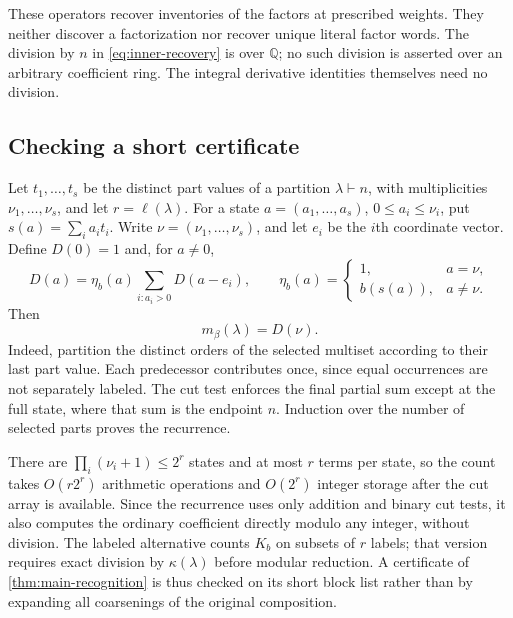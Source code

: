 \documentclass[11pt,a4paper]{amsart}
\numberwithin{equation}{section}
\theoremstyle{plain}
\theoremstyle{definition}
\newcommand{\Q}{\mathbb Q}
\begin{document}
These operators recover inventories of the factors at prescribed weights.
They neither discover a factorization nor recover unique literal factor
words.  The division by \(n\) in \eqref{eq:inner-recovery} is over \(\Q\);
no such division is asserted over an arbitrary coefficient ring.  The
integral derivative identities themselves need no division.

\subsection{Checking a short certificate}
Let \(t_1,\ldots,t_s\) be the distinct part values of a partition
\(\lambda\vdash n\), with multiplicities \(\nu_1,\ldots,\nu_s\),
and let \(r=\ell(\lambda)\).  For a state
\(a=(a_1,\ldots,a_s)\), \(0\le a_i\le\nu_i\), put
\(s(a)=\sum_i a_it_i\).  Write \(\nu=(\nu_1,\ldots,\nu_s)\),
and let \(e_i\) be the \(i\)th coordinate vector.  Define \(D(0)=1\)
and, for \(a\ne0\),
\[
D(a)=\eta_b(a)\sum_{i:a_i>0}D(a-e_i),\qquad
\eta_b(a)=\begin{cases}1,&a=\nu,\\ b(s(a)),&a\ne\nu.\end{cases}
\]
Then
\begin{equation}\label{eq:subset-dp}
m_\beta(\lambda)=D(\nu).
\end{equation}
Indeed, partition the distinct orders of the selected multiset according
to their last part value.  Each predecessor contributes once, since equal
occurrences are not separately labeled.  The cut test enforces the final
partial sum except at the full state, where that sum is the endpoint \(n\).
Induction over the number of selected parts proves the recurrence.

There are \(\prod_i(\nu_i+1)\le2^r\) states and at most \(r\) terms
per state, so the count takes \(O(r2^r)\) arithmetic operations and
\(O(2^r)\) integer storage after the cut array is available.  Since the
recurrence uses only addition and binary cut tests, it also computes the
ordinary coefficient directly modulo any integer, without division.
The labeled alternative counts \(K_b\) on subsets of \(r\) labels;
that version requires exact division by \(\kappa(\lambda)\) before
modular reduction.  A certificate of \cref{thm:main-recognition} is thus
checked on its short block list rather than by expanding all coarsenings
of the original composition.
\end{document}
